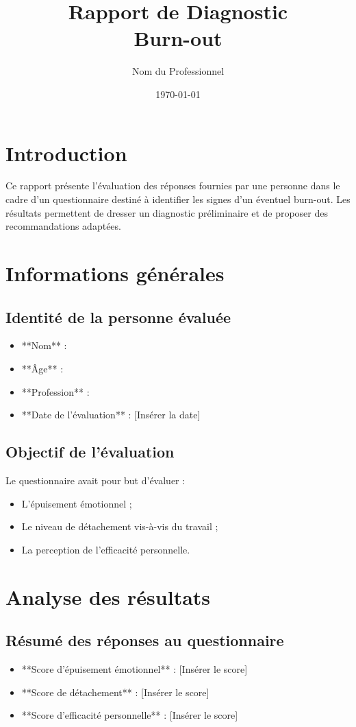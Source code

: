 \documentclass[12pt,a4paper]{report}
\title{Rapport de Diagnostic \\ Burn-out}
\author{Nom du Professionnel}
\date{\today}
\begin{document}
\maketitle

\tableofcontents
\newpage

\chapter*{Introduction}
Ce rapport présente l'évaluation des réponses fournies par une personne dans le cadre d’un questionnaire destiné à identifier les signes d’un éventuel burn-out. Les résultats permettent de dresser un diagnostic préliminaire et de proposer des recommandations adaptées.

\chapter{Informations générales}

\section{Identité de la personne évaluée}
\begin{itemize}
    \item **Nom** : \Nom
    \item **Âge** : \Age
    \item **Profession** : \Profession
    \item **Date de l'évaluation** : [Insérer la date]
\end{itemize}

\section{Objectif de l'évaluation}
Le questionnaire avait pour but d'évaluer :
\begin{itemize}
    \item L’épuisement émotionnel ;
    \item Le niveau de détachement vis-à-vis du travail ;
    \item La perception de l’efficacité personnelle.
\end{itemize}

\chapter{Analyse des résultats}

\section{Résumé des réponses au questionnaire}
\begin{itemize}
    \item **Score d'épuisement émotionnel** : [Insérer le score]
    \item **Score de détachement** : [Insérer le score]
    \item **Score d'efficacité personnelle** : [Insérer le score]
\end{itemize}
\end{document}
